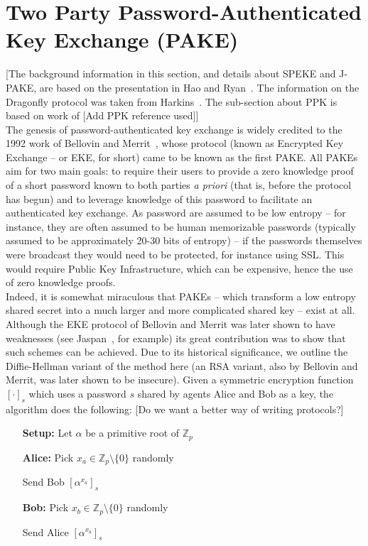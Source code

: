 \documentclass{amsart}
\newcommand{\comment}[1]{\marginpar{\color{red}{\Huge$*$}}\mbox{}{\sf\color{red}[#1]}}
\theoremstyle{remark}
\begin{document}

\section{Two Party Password-Authenticated Key Exchange (PAKE)} 
\label{sec:PAKE}
 [The background information in this section, and details about SPEKE and J-PAKE, are based on the presentation 
 in Hao and Ryan~\cite{HaRy2010}. The information on the Dragonfly protocol was taken from Harkins~\cite{Ha15}.  
 The sub-section about PPK is based on work of \comment{Add PPK reference used}]
 \\
 
 The genesis of password-authenticated key exchange is widely credited to the 1992 work of Bellovin and 
 Merrit~\cite{BeMe92}, whose protocol (known as Encrypted Key Exchange -- or EKE, for short) came to 
 be known as the first PAKE.  All PAKEs aim for two main goals: to require their users to provide a zero 
 knowledge proof of a short password known to both parties \emph{a priori} (that is, before the protocol 
 has begun) and to leverage knowledge of this password to facilitate an authenticated key exchange.  As 
 password are assumed to be low entropy -- for instance, they are often assumed to be human memorizable 
 passwords (typically assumed to be approximately 20-30 bits of entropy) -- if the passwords 
 themselves were broadcast they would need to be protected, for instance using SSL.  This would require Public 
 Key Infrastructure, which can be expensive, hence the use of zero knowledge proofs.
 \\

 Indeed, it is somewhat miraculous that PAKEs -- which transform a low entropy shared secret into a 
 much larger and more complicated shared key -- exist at all.  Although the EKE protocol of Bellovin and 
 Merrit was later shown to have weaknesses (see Jaspan~\cite{Ja96}, for example) its great contribution was 
 to show that such schemes can be achieved.  Due to its historical significance, we outline the Diffie-Hellman
 variant of the method here (an RSA variant, also by Bellovin and Merrit, was later shown to be insecure).  
 Given a symmetric encryption function $[\cdot]_s$ which uses a password $s$ shared
 by agents Alice and Bob as a key, the algorithm does the following: \comment{Do we want a better way of writing protocols?}
 \\

 \begin{itemize}
 \item[\textbf{Setup:}] Let $\alpha$ be a primitive root of $\mathbb{Z}_p$
 \item[\textbf{Alice:}] Pick $x_a \in \mathbb{Z}_p \setminus \{0\}$ randomly
 \item[] Send Bob $\left[\alpha^{x_a}\right]_s$
  \item[\textbf{Bob:}] Pick $x_b \in \mathbb{Z}_p \setminus \{0\}$ randomly
 \item[] Send Alice $\left[\alpha^{x_b}\right]_s$
 \item[]
 \end{itemize}
\end{document}
